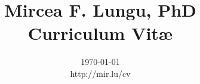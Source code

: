 \usepackage[applemac]{inputenc}
\usepackage{xcolor}
\usepackage{graphicx}
\usepackage{amssymb}
\usepackage{a4wide}
\usepackage{stringstrings}
\usepackage{titling}
\usepackage[pdftex,colorlinks=true,pdfstartview=FitV,linkcolor=black,citecolor= black,urlcolor= black]{hyperref}
\usepackage{ifthen}
\usepackage{fancyhdr}


\title{\textsf{Mircea F. Lungu, PhD \\Curriculum Vit\ae}}
\author{}

\pagestyle{myheadings}
\pagestyle{fancy}

\thispagestyle{plain}

\renewcommand{\headrulewidth}{0.0pt}
\renewcommand{\footrulewidth}{0.0pt}


\posttitle{\par\end{center}\vspace{-1.0cm}}
\date{\today\\\small http://mir.lu/cv}
\maketitle

\thispagestyle{empty}





\newcommand{\cvsection}[1]{\section*{\capitalizetitle{#1}}\vspace{-0.75em}\hrule\vspace{1em}}